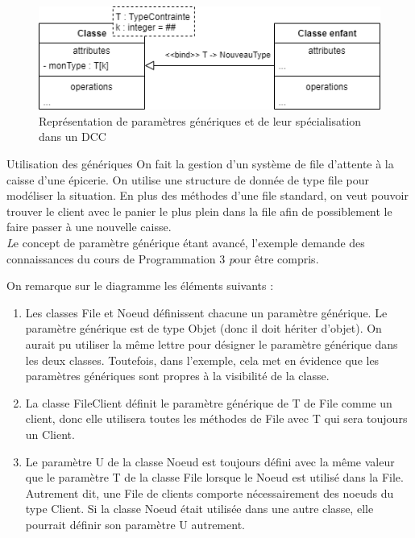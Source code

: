 \begin{figure}[H]
	\caption{Représentation de paramètres génériques et de leur spécialisation dans un \acrshort{DCC}}
	\centering
	\includegraphics[scale=0.7]{dcc-generique-bind.png}
\end{figure}

\begin{exemple}{Utilisation des génériques}
	On fait la gestion d'un système de file d'attente à la caisse d'une épicerie. On utilise une structure de donnée de type file pour modéliser la situation. En plus des méthodes d'une file standard, on veut pouvoir trouver le client avec le panier le plus plein dans la file afin de possiblement le faire passer à une nouvelle caisse.\\
	
	{\textit Le concept de paramètre générique étant avancé, l'exemple demande des connaissances du cours de} Programmation 3 {\textit pour être compris.}
	
	On remarque sur le diagramme les éléments suivants :
	\begin{enumerate}
		\item Les classes File et Noeud définissent chacune un paramètre générique. Le paramètre générique est de type Objet (donc il doit hériter d’objet). On aurait pu utiliser la même lettre pour désigner le paramètre générique dans les deux classes. Toutefois, dans l'exemple, cela met en évidence que les paramètres génériques sont propres à la visibilité de la classe.
		\item La classe FileClient définit le paramètre générique de T de File comme un client, donc elle utilisera toutes les méthodes de File avec T qui sera toujours un Client.
		\item Le paramètre U de la classe Noeud est toujours défini avec la même valeur que le paramètre T de la classe File lorsque le Noeud est utilisé dans la File. Autrement dit, une File de clients comporte nécessairement des noeuds du type Client. Si la classe Noeud était utilisée dans une autre classe, elle pourrait définir son paramètre U autrement.
	\end{enumerate}
	

\end{exemple}
